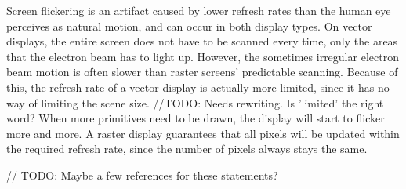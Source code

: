 Screen flickering is an artifact caused by lower refresh rates than the human eye perceives as natural motion, and can occur in both display types. \cite{flicker}
On vector displays, the entire screen does not have to be scanned every time, only the areas that the electron beam has to light up.
However, the sometimes irregular electron beam motion is often slower than raster screens' predictable scanning.
Because of this, the refresh rate of a vector display is actually more limited, since it has no way of limiting the scene size. //TODO: Needs rewriting. Is 'limited' the right word?
When more primitives need to be drawn, the display will start to flicker more and more.
A raster display guarantees that all pixels will be updated within the required refresh rate, since the number of pixels always stays the same.

// TODO: Maybe a few references for these statements?
